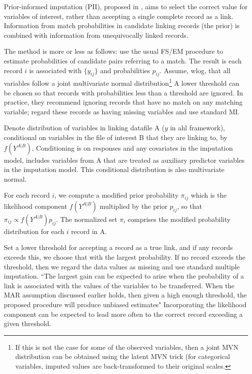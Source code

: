 \documentclass[12pt]{article}
\begin{document}
Prior-informed imputation (PII), proposed in \cite{Goldstein2012}, aims to select the
correct value for variables of interest, rather than accepting a single complete record as a link.  Information from match probabilities in candidate linking records (the prior) is combined with information
from unequivocally linked records.  

The method is more or less as follows: use the usual FS/EM procedure to estimate probabilities of candidate pairs referring to a match.  The result is each record $i$ is associated with $\{y_{ij}\}$ and probabilities $p_{ij}$.  Assume, wlog, that all variables follow a joint multivariate normal distribution\footnote{If this is not the case for some of the observed variables, then a joint MVN distribution can be obtained using the latent MVN trick (for categorical variables, imputed values are back-transformed to their original scales.} A lower threshold can be chosen so that records with probabilities less than a threshold are ignored.  In practice, they recommend ignoring records that have no match on any matching variable; regard these records as having missing variables and use standard MI.

Denote distribution of variables in linking datafile A ($y$ in ahl framework), conditional on variables in the file of interest B that they are linking to, by $f(Y^{A|B})$.   Conditioning is on responses and any covariates in the imputation model, includes variables from A that are treated as auxiliary predictor variables in the imputation model.  This conditional distribution is also multivariate normal.  

For each record $i$, we compute a modified prior probability $\pi_{ij}$ which is the likelihood component $f(Y^{A|B})$ multiplied by the prior $p_{ij}$, so that $\pi_{ij} \propto f(Y^{A|B}) p_{ij}$.  The normalized set $\pi_i$ comprises the modified probability distribution for each $i$ record in A.  

Set a lower threshold for accepting a record as a true link, and if any records exceeds this, we choose that with the largest probability.  If no record exceeds the threshold, then we regard the data values as missing and use standard multiple imputation.  ``The largest gain can be expected to arise
when the probability of a link is associated with the values of the variables to be transferred. When the
MAR assumption discussed earlier holds, then given a high enough threshold, the proposed procedure
will produce unbiased estimates" Incorporating the likelihood component can be expected to lead more often to the correct record exceeding a given threshold. 
\end{document}
